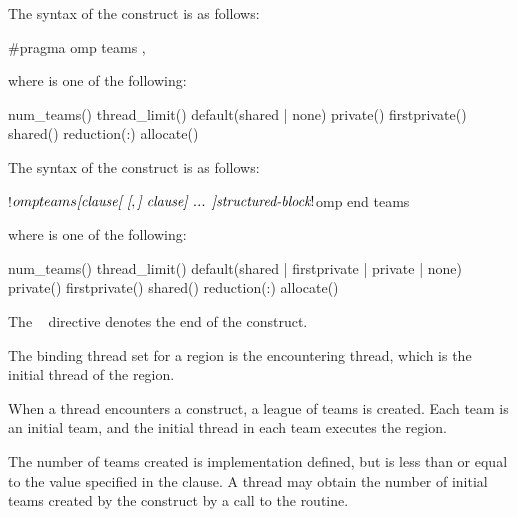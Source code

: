 \syntax
\begin{ccppspecific}
The syntax of the  construct is as follows:

\begin{ompcPragma}
#pragma omp teams \plc{[clause[ [},\plc{] clause] ... ] new-line}
\end{ompcPragma}

where  is one of the following:

\begin{indentedcodelist}
num_teams()
thread_limit()
default(shared \textnormal{|} none)
private()
firstprivate()
shared()
reduction(:)
allocate(\plc{[allocator: ]})
\end{indentedcodelist}
\end{ccppspecific}

\begin{fortranspecific}
The syntax of the  construct is as follows:

\begin{ompfPragma}
!$omp teams \plc{[clause[ [},\plc{] clause] ... ]}
    \plc{structured-block}
!$omp end teams
\end{ompfPragma}

where  is one of the following:

\begin{indentedcodelist}
num_teams()
thread_limit()
default(shared \textnormal{|} firstprivate \textnormal{|} private \textnormal{|} none)
private()
firstprivate()
shared()
reduction(:)
allocate(\plc{[allocator: ]})
\end{indentedcodelist}

The ~ directive denotes the end of the  construct.
\end{fortranspecific}

\begin{samepage}

\binding
The binding thread set for a  region is the encountering thread,
which is the initial thread of the  region.

\descr
When a thread encounters a  construct, a league of teams is
created. Each team is an initial team, and the initial thread in each team
executes the  region.

The number of teams created is implementation defined, but is less than or equal to the
value specified in the  clause.
A thread may obtain the number of initial teams created by the construct by a call to the  routine.

\end{samepage}

